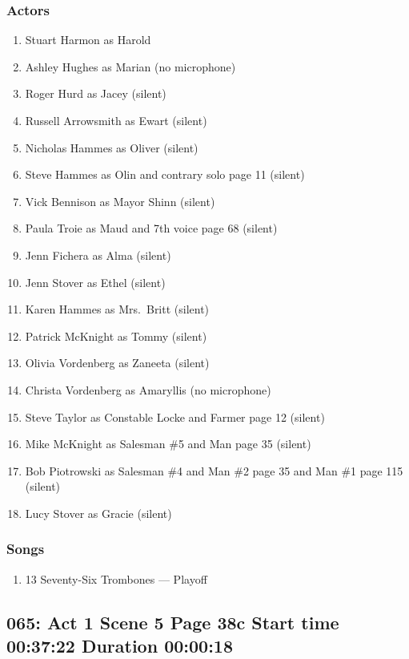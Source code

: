 \subsubsection{Actors}
\begin{enumerate}
\item Stuart Harmon as Harold
\item Ashley Hughes as Marian (no microphone)
\item Roger Hurd as Jacey (silent)
\item Russell Arrowsmith as Ewart (silent)
\item Nicholas Hammes as Oliver (silent)
\item Steve Hammes as Olin and contrary solo page 11 (silent)
\item Vick Bennison as Mayor Shinn (silent)
\item Paula Troie as Maud and 7th voice page 68 (silent)
\item Jenn Fichera as Alma (silent)
\item Jenn Stover as Ethel (silent)
\item Karen Hammes as Mrs.~Britt (silent)
\item Patrick McKnight as Tommy (silent)
\item Olivia Vordenberg as Zaneeta (silent)
\item Christa Vordenberg as Amaryllis (no microphone)
\item Steve Taylor as Constable Locke and Farmer page 12 (silent)
\item Mike McKnight as Salesman \#5 and Man page 35 (silent)
\item Bob Piotrowski as Salesman \#4 and Man \#2 page 35 and Man \#1 page 115 (silent)
\item Lucy Stover as Gracie (silent)
\end{enumerate}

\subsubsection{Songs}
\begin{enumerate}
\item 13 Seventy-Six Trombones --- Playoff
\end{enumerate}
\subsection{065: Act 1 Scene 5 Page 38c Start time 00:37:22 Duration 00:00:18}

